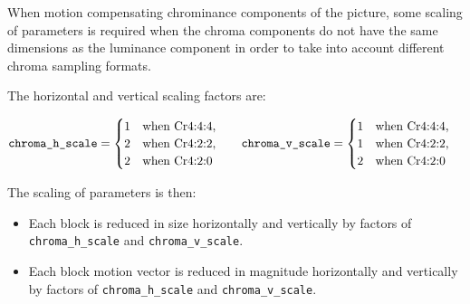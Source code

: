 \label{mc:scale}
When motion compensating chrominance components of the picture, some
scaling of parameters is required when the chroma components
do not have the same dimensions as the luminance component in order to
take into account different chroma sampling formats.

The horizontal and vertical scaling factors are:

\begin{align*}
\text{\texttt{chroma\_h\_scale}} =
  \begin{cases}
    1 &\text{when Cr4:4:4},\\
    2 &\text{when Cr4:2:2},\\
    2 &\text{when Cr4:2:0}
  \end{cases}
&\qquad
\text{\texttt{chroma\_v\_scale}} =
  \begin{cases}
    1 &\text{when Cr4:4:4},\\
    1 &\text{when Cr4:2:2},\\
    2 &\text{when Cr4:2:0}
  \end{cases}
\end{align*}

The scaling of parameters is then:
\begin{itemize}
\item Each block is reduced in size horizontally and vertically by
factors of \texttt{chroma\_h\_scale} and \texttt{chroma\_v\_scale}.

\item Each block motion vector is reduced in magnitude horizontally
and vertically by factors of \texttt{chroma\_h\_scale} and
\texttt{chroma\_v\_scale}.

\end{itemize}
